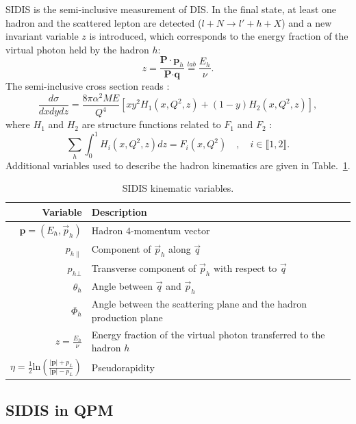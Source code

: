 SIDIS is the semi-inclusive measurement of DIS. In the final state, at least one hadron and the scattered lepton are detected ($l+N \rightarrow l'+h+X$) and a new invariant variable $z$ is introduced, which corresponds to the energy fraction of the virtual photon held by the hadron $h$:
%
\begin{equation}
  z = \frac{\textbf{P}\cdot\textbf{p}_h}{\textbf{P}\cdot\textbf{q}} \stackrel{lab}{=} \frac{E_h}{\nu}.
  \label{eq:SIDIS}
\end{equation}
%
The semi-inclusive cross section reads \cite{SIDISXS}:
%
\begin{equation}
  \frac{d\sigma}{dxdydz} = \frac{8\pi\alpha^2ME}{Q^4}\left[xy^2H_1(x,Q^2,z)+(1-y)H_2(x,Q^2,z)\right],
  \label{eq:SIDISXS}
\end{equation}
%
where $H_1$ and $H_2$ are structure functions related to $F_1$ and $F_2$ \cite{BERGER,SIDISXS}:
%
\begin{equation}
  \sum\limits_{h}\int_{0}^{1} H_i(x,Q^2,z)dz = F_i(x,Q^2)\quad,\quad i \in  \llbracket1,2\rrbracket.
\end{equation}
%
Additional variables used to describe the hadron kinematics are given in Table.~\ref{tab:SIDIS}.

\begin{table}[h!]
  \caption{SIDIS kinematic variables.}
  \label{tab:SIDIS}
  \begin{tabularx}{\textwidth}{r|lX}
    \hline
    \hline
    Variable & Description \\
    \hline
    \hline
    $\textbf{p}=(E_h,\vec{p}_h)$ & Hadron $4$-momentum vector \\
    $p_{h\|}$ & Component of $\vec{p}_h$ along $\vec{q}$ \\
    $p_{h\bot}$ & Transverse component of $\vec{p}_h$ with respect to $\vec{q}$ \\
    $\theta_h$ & Angle between $\vec{q}$ and $\vec{p}_h$ \\
    $\Phi_h$ & Angle between the scattering plane and the hadron production plane \\
    $z=\frac{E_h}{\nu}$ & Energy fraction of the virtual photon transferred to the hadron $h$ \\
    $\eta=\frac{1}{2}\text{ln}\left(\frac{|\mathbf{p}|+p_L}{|\mathbf{p}|-p_L} \right)$ & Pseudorapidity \\
    \hline
    \hline
  \end{tabularx}
\end{table}

\subsection{SIDIS in QPM}

